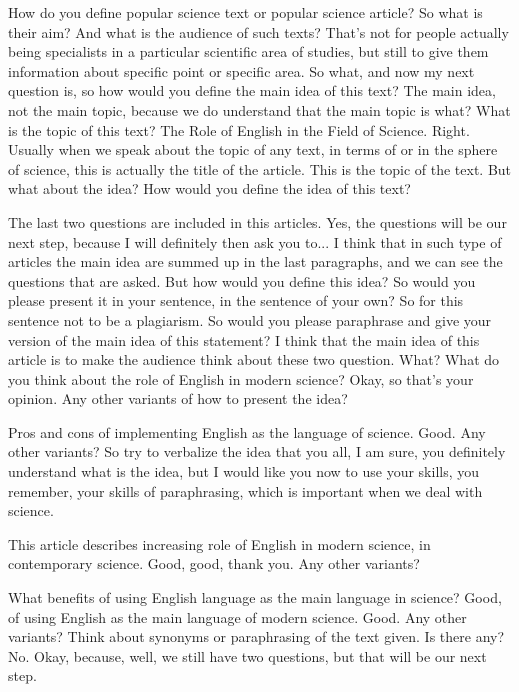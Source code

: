 \documentclass[main.tex]{subfiles}
\begin{document}
How do you define popular science text or popular science article?
So what is their aim?
And what is the audience of such texts?
That's not for people actually being specialists in a particular scientific area of studies, but still to give them information about specific point or specific area.
So what, and now my next question is, so how would you define the main idea of this text?
The main idea, not the main topic, because we do understand that the main topic is what?
What is the topic of this text?
The Role of English in the Field of Science.
Right.
Usually when we speak about the topic of any text, in terms of or in the sphere of science, this is actually the title of the article.
This is the topic of the text.
But what about the idea?
How would you define the idea of this text?

The last two questions are included in this articles.
Yes, the questions will be our next step, because I will definitely then ask you to...
I think that in such type of articles the main idea are summed up in the last paragraphs, and we can see the questions that are asked.
But how would you define this idea?
So would you please present it in your sentence, in the sentence of your own?
So for this sentence not to be a plagiarism.
So would you please paraphrase and give your version of the main idea of this statement?
I think that the main idea of this article is to make the audience think about these two question.
What?
What do you think about the role of English in modern science?
Okay, so that's your opinion.
Any other variants of how to present the idea?

Pros and cons of implementing English as the language of science.
Good.
Any other variants?
So try to verbalize the idea that you all, I am sure, you definitely understand what is the idea, but I would like you now to use your skills, you remember, your skills of paraphrasing, which is important when we deal with science.

This article describes increasing role of English in modern science, in contemporary science.
Good, good, thank you.
Any other variants?

What benefits of using English language as the main language in science?
Good, of using English as the main language of modern science.
Good.
Any other variants?
Think about synonyms or paraphrasing of the text given.
Is there any?
No.
Okay, because, well, we still have two questions, but that will be our next step.
\end{document}
